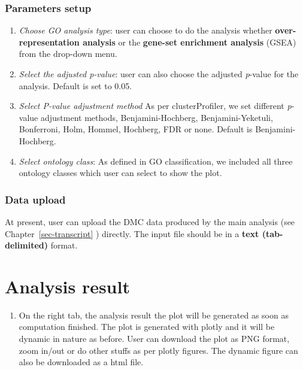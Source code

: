 \documentclass[
  a4paper,
  oneside,
  open=any]{scrreport}
\providecommand{\tightlist}{%
  \setlength{\itemsep}{0pt}\setlength{\parskip}{0pt}}\usepackage{longtable,booktabs,array}
\begin{document}
\hypertarget{parameters-setup}{%
\subsubsection{Parameters setup}\label{parameters-setup}}

\begin{enumerate}
\def\labelenumi{\arabic{enumi}.}
\tightlist
\item
  \emph{Choose GO analysis type}: user can choose to do the analysis
  whether \textbf{over-representation analysis} or the \textbf{gene-set
  enrichment analysis} (GSEA) from the drop-down menu.
\item
  \emph{Select the adjusted p-value}: user can also choose the adjusted
  \emph{p}-value for the analysis. Default is set to 0.05.
\item
  \emph{Select P-value adjustment method} As per clusterProfiler, we set
  different \emph{p}-value adjustment methods, Benjamini-Hochberg,
  Benjamini-Yeketuli, Bonferroni, Holm, Hommel, Hochberg, FDR or none.
  Default is Benjamini-Hochberg.
\item
  \emph{Select ontology class}: As defined in GO classification, we
  included all three ontology classes which user can select to show the
  plot.
\end{enumerate}

\hypertarget{data-upload-3}{%
\subsubsection{Data upload}\label{data-upload-3}}

At present, user can upload the DMC data produced by the main analysis
(see Chapter~\ref{sec-transcript} ) directly. The input file should be
in a \textbf{text (tab-delimited)} format.

\hypertarget{analysis-result-3}{%
\section{Analysis result}\label{analysis-result-3}}

\begin{enumerate}
\def\labelenumi{\arabic{enumi}.}
\tightlist
\item
  On the right tab, the analysis result the plot will be generated as
  soon as computation finished. The plot is generated with plotly and it
  will be dynamic in nature as before. User can download the plot as PNG
  format, zoom in/out or do other stuffs as per plotly figures. The
  dynamic figure can also be downloaded as a html file.
\end{enumerate}
\end{document}
